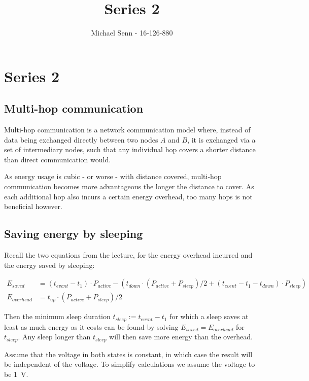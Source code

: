 \documentclass[a4paper]{scrreprt}
\title{Series 2}
\author{Michael Senn \maillink{michael.senn@students.unibe.ch} - 16-126-880}
\date{\printdate}
\begin{document}
\maketitle


\setcounter{chapter}{1}

\chapter{Series 2}

\section{Multi-hop communication}

Multi-hop communication is a network communication model where, instead of data
being exchanged directly between two nodes $A$ and $B$, it is exchanged via a
set of intermediary nodes, such that any individual hop covers a shorter
distance than direct communication would.

As energy usage is cubic - or worse - with distance covered, multi-hop
communication becomes more advantageous the longer the distance to cover. As
each additional hop also incurs a certain energy overhead, too many hops is not
beneficial however.

\section{Saving energy by sleeping}

Recall the two equations from the lecture, for the energy overhead incurred and
the energy saved by sleeping:

\begin{align*}
		E_{saved} & = (t_{event} - t_1) \cdot P_{active} - (t_{down} \cdot (P_{active} + P_{sleep}) / 2 + (t_{event} - t_1 - t_{down}) \cdot P_{sleep}) \\
		E_{overhead} & = t_{up} \cdot(P_{active} + P_{sleep}) / 2
\end{align*}

Then the minimum sleep duration $t_{sleep} := t_{event} - t_{1}$ for which a
sleep saves at least as much energy as it costs can be found by solving
$E_{saved} = E_{overhead}$ for $t_{sleep}$. Any sleep longer than $t_{sleep}$
will then save more energy than the overhead.

Assume that the voltage in both states is constant, in which case the result
will be independent of the voltage. To simplify calculations we assume the
voltage to be \SI{1}{\V}.
\end{document}
